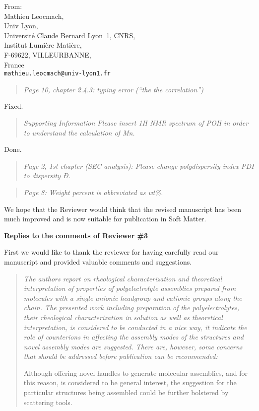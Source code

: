 \documentclass[a4paper, parskip=true, firsthead=false, fromemail=true, foldmarks=false]{scrlttr2}
\newenvironment{quotationi}
{\begin{quotation}\itshape}
{\end{quotation}}
\newcommand{\journal}{Soft Matter}
\begin{document}
\begin{letter}{From:\\
Mathieu Leocmach,\\
Univ Lyon,\\ 
Universit\'e Claude Bernard Lyon~1, CNRS,\\
Institut Lumi\`ere Mati\`ere,\\
F-69622, VILLEURBANNE,\\
France\\
\texttt{mathieu.leocmach@univ-lyon1.fr}
}
\begin{quotationi}
Page 10, chapter 2.4.3: typing error (“the the correlation”)
\end{quotationi}

Fixed.

\begin{quotationi}
Supporting Information
Please insert 1H NMR spectrum of POH in order to understand the calculation of Mn.
\end{quotationi}

Done.

\begin{quotationi}
Page 2, 1st chapter (SEC analysis): Please change polydispersity index PDI to dispersity Ð.
\end{quotationi}

\begin{quotationi}
Page 8: Weight percent is abbreviated as wt\%.
\end{quotationi}





We hope that the Reviewer would think that the revised manuscript has been much improved and is now suitable for publication in \journal. 
 
\clearpage

\textsf{\textbf{Replies to the comments of Reviewer \#3}}

First we would like to thank the reviewer for having carefully read our manuscript and provided valuable comments and suggestions.

\begin{quotationi}
The authors report on rheological characterization and theoretical interpretation of properties of polyelectrolyte assemblies prepared from molecules with a single anionic headgroup and cationic groups along the chain. The presented work including preparation of the polyelectrolytes, their rheological characterization in solution as well as theoretical interpretation, is considered to be conducted in a nice way, it indicate the role of counterions in affecting the assembly modes of the structures and novel assembly modes are suggested. There are, however, some concerns that should be addressed before publication can be recommended:

Although offering novel handles to generate molecular assemblies, and for this reason, is considered to be general interest, the suggestion for the particular structures being assembled could be further bolstered by scattering tools.
\end{quotationi}


\end{letter}
\end{document}
